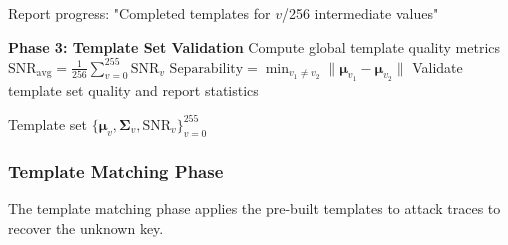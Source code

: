 \documentclass[11pt,a4paper]{article}
\theoremstyle{definition}
\begin{document}
\begin{algorithm}
\begin{algorithmic}[1]
        \STATE Report progress: "Completed templates for $v$/256 intermediate values"
    \ENDIF
\ENDFOR

\STATE \textbf{Phase 3: Template Set Validation}
\STATE Compute global template quality metrics
\STATE $\text{SNR}_{\text{avg}} = \frac{1}{256} \sum_{v=0}^{255} \text{SNR}_v$
\STATE $\text{Separability} = \min_{v_1 \neq v_2} \|\boldsymbol{\mu}_{v_1} - \boldsymbol{\mu}_{v_2}\|$
\STATE Validate template set quality and report statistics

\RETURN Template set $\{\boldsymbol{\mu}_v, \boldsymbol{\Sigma}_v, \text{SNR}_v\}_{v=0}^{255}$
\end{algorithmic}
\end{algorithm}

\subsubsection{Template Matching Phase}

The template matching phase applies the pre-built templates to attack traces to recover the unknown key.
\end{document}
